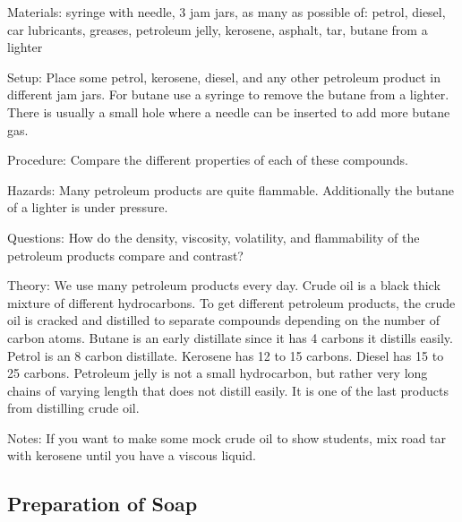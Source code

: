 \begin{multicols}{2}
\begin{description*}
\item[Materials:]{syringe with needle, 3 jam jars, as many as possible of: petrol, diesel, car lubricants, greases, petroleum jelly, kerosene, asphalt, tar, butane from a lighter}
\item[Setup:]{Place some petrol, kerosene, diesel, and any other petroleum product in different jam jars. For butane use a syringe to remove the butane from a lighter. There is usually a small hole where a needle can be inserted to add more butane gas. }
\item[Procedure:]{Compare the different properties of each of these compounds.}
\item[Hazards:]{Many petroleum products are quite flammable. Additionally the butane of a lighter is under pressure.}
\item[Questions:]{How do the density, viscosity, volatility, and flammability of the petroleum products compare and contrast?}
\item[Theory:]{We use many petroleum products every day. Crude oil is a black thick mixture of different hydrocarbons. To get different petroleum products, the crude oil is cracked and distilled to separate compounds depending on the number of carbon atoms. Butane is an early distillate since it has 4 carbons it distills easily. Petrol is an 8 carbon distillate. Kerosene has 12 to 15 carbons. Diesel has 15 to 25 carbons. Petroleum jelly is not a small hydrocarbon, but rather very long chains of varying length that does not distill easily. It is one of the last products from distilling crude oil.}
\item[Notes:]{If you want to make some mock crude oil to show students, mix road tar with kerosene until you have a viscous liquid.}
\end{description*}

\subsection{Preparation of Soap}



\end{multicols}
